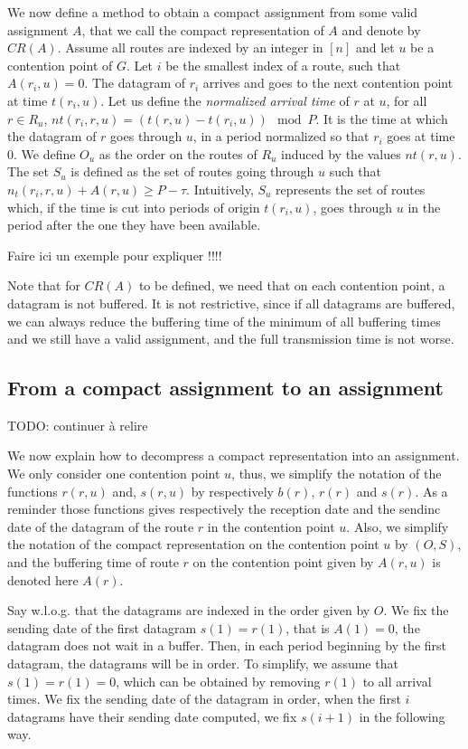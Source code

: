 \documentclass[english]{article}
\begin{document}
We now define a method to obtain a compact assignment from some valid assignment $A$, that we call the compact representation of $A$ and denote by $CR(A)$. Assume all routes are indexed by an integer in $[n]$ and let $u$ be a contention point of $G$.
Let $i$ be the smallest index of a route, such that $A(r_i,u) = 0$. The datagram of $r_i$ arrives and goes to the next contention point at time $t(r_i,u)$. Let us define the \emph{normalized arrival time} of $r$ at $u$, for all $r \in R_u$, $nt(r_i,r,u) = (t(r,u) - t(r_i,u)) \mod P$. It is the time at which the datagram of $r$ goes through $u$, in a period normalized so that $r_i$ goes at time $0$. We define $O_u$ as the order on the routes of $R_u$ induced by the values $nt(r,u)$. The set $S_u$ is defined as the set of routes going through $u$ such that $n_t(r_i,r,u) + A(r,u) \geq P - \tau$. Intuitively, $S_u$ represents the set of routes which, if the time is cut into periods of origin $t(r_i,u)$,
goes through $u$ in the period after the one they have been available.



Faire ici un exemple pour expliquer !!!!

Note that for $CR(A)$ to be defined, we need that on each contention point, a datagram is not buffered. It is not restrictive, since if all datagrams are buffered, we can always reduce the buffering time of the minimum of all buffering times and we still have a valid assignment, and the full transmission time is not worse.


\subsection{From a compact assignment to an assignment}


TODO: continuer à relire

We now explain how to decompress a compact representation into an assignment.
We only consider one contention point $u$, thus, we simplify the notation of the functions  $r(r,u)$ and, $s(r,u)$ by respectively $b(r)$, $r(r)$ and $s(r)$.
As a reminder those functions gives respectively the reception date and the sendinc date of the datagram of the route $r$ in the contention point $u$. Also, we simplify the notation of the compact representation on the contention point $u$ by $(O,S)$, and the buffering time of route $r$ on the contention point given by $A(r,u)$ is denoted here $A(r)$.

Say w.l.o.g. that the datagrams are indexed in the order given by $O$.
We fix the sending date of the first datagram $s(1) = r(1)$, that is $A(1) = 0$, the datagram does not wait in a buffer. Then, in each period beginning by the first datagram, the datagrams will be in order. To simplify, we assume that $s(1) = r(1) = 0$, which can be obtained by removing $r(1)$ to all arrival times. We fix the sending date of the datagram in order, when the first $i$ datagrams have their sending date computed, we fix $s(i+1)$ in the following way. 
\end{document}
